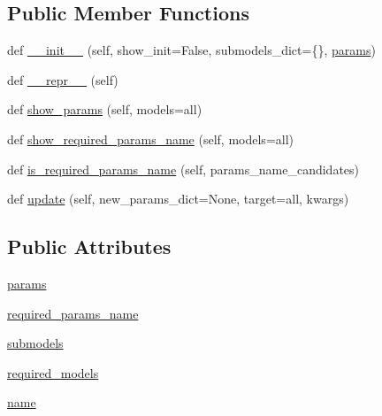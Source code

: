 \subsection*{Public Member Functions}
\begin{DoxyCompactItemize}
\item 
def \hyperlink{classdsph__model_1_1model_a09edf285220369ef40d5f8d9dd352059}{\+\_\+\+\_\+init\+\_\+\+\_\+} (self, show\+\_\+init=False, submodels\+\_\+dict=\{\}, \hyperlink{classdsph__model_1_1model_a6065e2aaacf2408cb5e5c0560bd852d6}{params})
\item 
def \hyperlink{classdsph__model_1_1model_a5445148b72ecd03858f543cb7c9c2c6f}{\+\_\+\+\_\+repr\+\_\+\+\_\+} (self)
\item 
def \hyperlink{classdsph__model_1_1model_a44b8bf302a0786eb9a492a904213f977}{show\+\_\+params} (self, models=\textquotesingle{}all\textquotesingle{})
\item 
def \hyperlink{classdsph__model_1_1model_a399541f174c45f4f640f7fcbeed99e00}{show\+\_\+required\+\_\+params\+\_\+name} (self, models=\textquotesingle{}all\textquotesingle{})
\item 
def \hyperlink{classdsph__model_1_1model_a9826d4256eb05869703fb1a989503ecc}{is\+\_\+required\+\_\+params\+\_\+name} (self, params\+\_\+name\+\_\+candidates)
\item 
def \hyperlink{classdsph__model_1_1model_a80a9ec2a3ea7ead926e609f6e3d316f0}{update} (self, new\+\_\+params\+\_\+dict=None, target=\textquotesingle{}all\textquotesingle{}, kwargs)
\end{DoxyCompactItemize}
\subsection*{Public Attributes}
\begin{DoxyCompactItemize}
\item 
\hyperlink{classdsph__model_1_1model_a6065e2aaacf2408cb5e5c0560bd852d6}{params}
\item 
\hyperlink{classdsph__model_1_1model_a29f4fc5b8abf614776cfda3b6f72911f}{required\+\_\+params\+\_\+name}
\item 
\hyperlink{classdsph__model_1_1model_ab75d0b914dcaeb85599e434ee7ea22dc}{submodels}
\item 
\hyperlink{classdsph__model_1_1model_aa8a40f5b5693b44327acbcce9ac02324}{required\+\_\+models}
\item 
\hyperlink{classdsph__model_1_1model_ab619deb7b25e9fe63f8d542a04f14e53}{name}
\end{DoxyCompactItemize}


